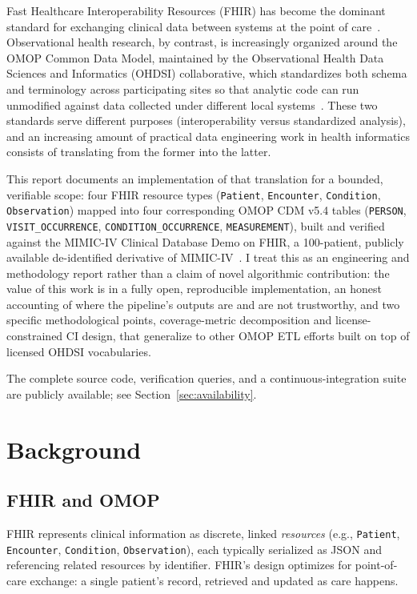 \documentclass[11pt]{article}
\begin{document}
Fast Healthcare Interoperability Resources (FHIR) has become the dominant
standard for exchanging clinical data between systems at the point of
care~\cite{hl7fhir}. Observational health research, by contrast, is
increasingly organized around the OMOP Common Data Model, maintained by the
Observational Health Data Sciences and Informatics (OHDSI) collaborative,
which standardizes both schema and terminology across participating sites
so that analytic code can run unmodified against data collected under
different local systems~\cite{hripcsak2015ohdsi}. These two standards serve
different purposes (interoperability versus standardized analysis), and
an increasing amount of practical data engineering work in health
informatics consists of translating from the former into the latter.

This report documents an implementation of that translation for a bounded,
verifiable scope: four FHIR resource types (\texttt{Patient},
\texttt{Encounter}, \texttt{Condition}, \texttt{Observation}) mapped into
four corresponding OMOP CDM v5.4 tables (\texttt{PERSON},
\texttt{VISIT\_OCCURRENCE}, \texttt{CONDITION\_OCCURRENCE},
\texttt{MEASUREMENT}), built and verified against the MIMIC-IV Clinical
Database Demo on FHIR, a 100-patient, publicly available de-identified
derivative of MIMIC-IV~\cite{bennett2023mimicfhir, bennett2025physionet,
johnson2023mimiciv}. I treat this as an engineering and methodology report
rather than a claim of novel algorithmic contribution: the value of this
work is in a fully open, reproducible implementation, an honest accounting
of where the pipeline's outputs are and are not trustworthy, and two
specific methodological points, coverage-metric decomposition and
license-constrained CI design, that generalize to other OMOP ETL efforts
built on top of licensed OHDSI vocabularies.

The complete source code, verification queries, and a continuous-integration
suite are publicly available; see Section~\ref{sec:availability}.

\section{Background}

\subsection{FHIR and OMOP}

FHIR represents clinical information as discrete, linked \emph{resources}
(e.g., \texttt{Patient}, \texttt{Encounter}, \texttt{Condition},
\texttt{Observation}), each typically serialized as JSON and referencing
related resources by identifier. FHIR's design optimizes for point-of-care
exchange: a single patient's record, retrieved and updated as care happens.
\end{document}
